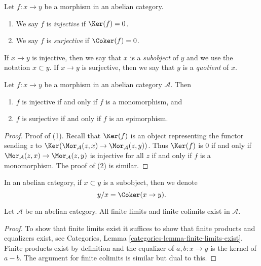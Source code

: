 \begin{definition}
\label{definition-injective-surjective}
Let $f : x \to y$ be a morphism in an abelian category.
\begin{enumerate}
\item We say $f$ is {\it injective} if $\Ker(f) = 0$.
\item We say $f$ is {\it surjective} if $\Coker(f) = 0$.
\end{enumerate}
If $x \to y$ is injective, then we say that $x$ is a {\it subobject}
of $y$ and we use the notation $x \subset y$. If $x \to y$ is
surjective, then we say that $y$ is a {\it quotient} of $x$.
\end{definition}

\begin{lemma}
\label{lemma-characterize-injective}
Let $f : x \to y$ be a morphism in an abelian category $\mathcal{A}$. Then
\begin{enumerate}
\item $f$ is injective if and only if $f$ is a monomorphism, and
\item $f$ is surjective if and only if $f$ is an epimorphism.
\end{enumerate}
\end{lemma}

\begin{proof}
Proof of (1). Recall that $\Ker(f)$ is an object representing the
functor sending $z$ to
$\Ker(\Mor_\mathcal{A}(z, x) \to \Mor_\mathcal{A}(z, y))$.
Thus $\Ker(f)$ is $0$ if and only if
$\Mor_\mathcal{A}(z, x) \to \Mor_\mathcal{A}(z, y)$
is injective for all $z$ if and only if $f$ is a monomorphism.
The proof of (2) is similar.
\end{proof}

\noindent
In an abelian category, if $x \subset y$ is a subobject,
then we denote
$$
y/x = \Coker(x \to y).
$$

\begin{lemma}
\label{lemma-colimit-abelian-category}
Let $\mathcal{A}$ be an abelian category.
All finite limits and finite colimits exist in $\mathcal{A}$.
\end{lemma}

\begin{proof}
To show that finite limits exist it suffices to show
that finite products and equalizers exist, see
Categories, Lemma \ref{categories-lemma-finite-limits-exist}.
Finite products exist
by definition and the equalizer of $a, b : x \to y$ is
the kernel of $a - b$. The argument for finite colimits
is similar but dual to this.
\end{proof}

